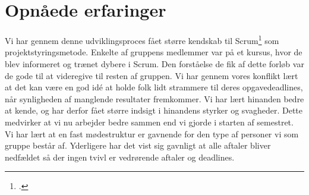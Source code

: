 \section{Opnåede erfaringer}

Vi har gennem denne udviklingsproces fået større kendskab til Scrum\footcite{scrum} som projektstyringsmetode. Enkelte af gruppens medlemmer var på et kursus, hvor de blev informeret og trænet dybere i Scrum. Den forståelse de fik af dette forløb var de gode til at videregive til resten af gruppen. 
Vi har gennem vores konflikt lært at det kan være en god idé at holde folk lidt strammere til deres opgavedeadlines, når synligheden af manglende resultater fremkommer.  
Vi har lært hinanden bedre at kende, og har derfor fået større indsigt i hinandens styrker og svagheder. Dette medvirker at vi nu arbejder bedre sammen end vi gjorde i starten af semestret.
Vi har lært at en fast mødestruktur er gavnende for den type af personer vi som gruppe består af.
Yderligere har det vist sig gavnligt at alle aftaler bliver nedfældet så der ingen tvivl er vedrørende aftaler og deadlines.
